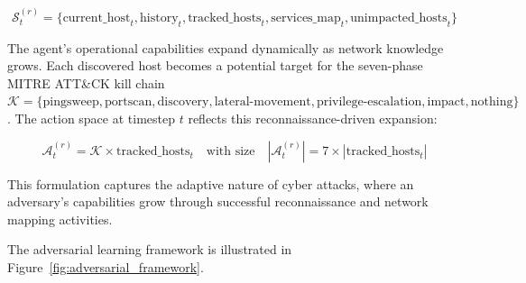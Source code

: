 \documentclass[12pt,oneside]{article}
\begin{document}
\begin{equation}
\mathcal{S}^{(r)}_t = \{\text{current\_host}_t, \text{history}_t, \text{tracked\_hosts}_t, \text{services\_map}_t, \text{unimpacted\_hosts}_t\}
\end{equation}

The agent's operational capabilities expand dynamically as network knowledge grows. Each discovered host becomes a potential target for the seven-phase MITRE ATT\&CK kill chain $\mathcal{K} = \{\text{pingsweep}, \text{portscan}, \text{discovery}, \text{lateral-movement}, \text{privilege-escalation}, \text{impact}, \text{nothing}\}$. The action space at timestep $t$ reflects this reconnaissance-driven expansion:

\begin{equation}
\mathcal{A}^{(r)}_t = \mathcal{K} \times \text{tracked\_hosts}_t \quad \text{with size} \quad |\mathcal{A}^{(r)}_t| = 7 \times |\text{tracked\_hosts}_t|
\end{equation}

This formulation captures the adaptive nature of cyber attacks, where an adversary's capabilities grow through successful reconnaissance and network mapping activities.

The adversarial learning framework is illustrated in Figure~\ref{fig:adversarial_framework}.
\end{document}
